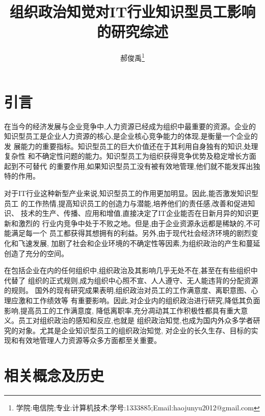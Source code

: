 \documentclass[10pt,a4paper]{article}
\begin{document}
\begin{CJK*}{UTF8}{gkai}
\pagestyle{fancy} 
\lhead{}
\rhead{}
\title{组织政治知觉对IT行业知识型员工影响的研究综述}					%
\author{郝俊禹\thanks{学院:电信院;\;专业:计算机技术;\;学号:1333885;\;Email:haojunyu2012@gmail.com}}									%
\date{}                                             				%
\maketitle                                          				%
\tableofcontents 												%
\clearpage


\section{引言}
在当今的经济发展与企业竞争中,人力资源已经成为组织中最重要的资源。企业的
知识型员工是企业人力资源的核心,是企业核心竞争能力的体现,是衡量一个企业的发
展能力的重要指标。知识型员工的巨大价值还在于其利用自身独有的知识,处理复杂性
和不确定性问题的能力。知识型员工为组织获得竞争优势及稳定增长方面起到不可替代
的重要作用,如果知识型员工没有被有效地管理,他们就不能发挥出独特的作用。


对于IT行业这种新型产业来说,知识型员工的作用更加明显。因此,能否激发知识型员工
的工作热情,提高知识员工的创造力与潜能,培养他们的责任感,改善和促进知识、
技术的生产、传播、应用和增值,直接决定了IT企业能否在日新月异的知识更新和激烈的
行业内竞争中处于不败之地。但是,由于企业资源永远都是稀缺的,不可能满足每一个
员工都获得其想拥有的利益。另外,由于现代社会经济环境的剧烈变化和飞速发展,
加剧了社会和企业环境的不确定性等因素,为组织政治的产生和蔓延创造了充分的空间。


在包括企业在内的任何组织中,组织政治及其影响几乎无处不在,甚至在有些组织中代替了
组织的正式规则,成为组织中心照不宣、人人遵守、无人能违背的分配资源的规则。
国外的现有研究成果表明,组织政治对员工的工作满意度、离职意图、心理应激和工作绩效等
有重要影响。因此,对企业内的组织政治进行研究,降低其负面影响,提高员工的工作满意度,
降低离职率,充分凋动其工作积极性都具有重大意义。员工对组织政治的感知和反应,也就是
组织政治知觉,也成为国内外众多学者研究的对象。尤其是企业知识型员工的组织政治知觉,
对企业的长久生存、目标的实现和有效地管理人力资源等众多方面都至关重要。


\section{相关概念及历史}

\end{CJK*}
\end{document}

